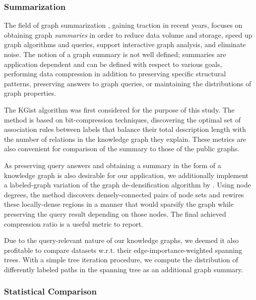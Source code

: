 \subsubsection{Summarization}

The field of graph summarization \cite{liu_graph_2019}, gaining traction in recent years, focuses on obtaining graph \emph{summaries} in order to reduce data volume and storage, speed up graph algorithms and queries, support interactive graph analysis, and eliminate noise. The notion of a graph summary is not well defined; summaries are application dependent and can be defined with respect to various goals, performing data compression in addition to preserving specific structural patterns, preserving answers to graph queries, or maintaining the distributions of graph properties. 

The KGist algorithm \cite{belth_what_2020} was first considered for the purpose of this study. The method is based on bit-compression techniques, discovering the optimal set of association rules between labels that balance their total description length with the number of relations in the knowledge graph they explain. These metrics are also convenient for comparison of the summary to those of the public graphs.

As preserving query answers and obtaining a summary in the form of a knowledge graph is also desirable for our application, we additionally implement a labeled-graph variation of the graph de-densification algorithm by \cite{maccioni_scalable_2016}. Using node degrees, the method discovers densely-connected pairs of node sets and rewires these locally-dense regions in a manner that would sparsify the graph while preserving the query result depending on those nodes. The final achieved compression ratio is a useful metric to report. 

Due to the query-relevant nature of our knowledge graphs, we deemed it also profitable to compare datasets w.r.t. their edge-importance-weighted spanning trees. With a simple tree iteration procedure, we compute the distribution of differently labeled paths in the spanning tree as an additional graph summary.

\subsubsection{Statistical Comparison}

